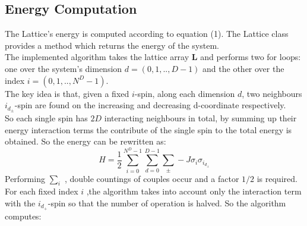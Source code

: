 \documentclass[11pt,a4paper]{article}
\begin{document}
\newpage
\subsection{Energy Computation}

The Lattice's energy is computed according to equation (1).
The Lattice class provides a method which returns the energy of the system. \\
The implemented algorithm takes the lattice array $\mathbf{L}$ and performs two for loops:\\ 
one over the system's dimension $d = (0,1,..,D-1)$ and the other over the index $i = (0,1,..,N^D-1)$. \\
The key idea is that, given a fixed $i$-spin, along each dimension $d$, two neighbours $i_{d_\pm}$-spin are found on the increasing and decreasing d-coordinate respectively.
\\So each single spin has $2D$ interacting neighbours in total, by summing up their energy interaction terms the contribute of the single spin to the total energy is obtained. So the energy can be rewritten as:
\begin{equation}
H = \frac{1}{2}\sum_{i=0}^{N^D-1}\sum_{d=0}^{D-1}\sum_{\pm}^{} -J\sigma_i\sigma_{i_{d_\pm}}
\end{equation}
Performing $\sum_{i}^{}$ , double countings of couples occur and a factor $1/2$ is required. \\
For each fixed index $i$ ,the algorithm takes into account only the interaction term with the
$i_{d_+}$-spin so that the number of operation is halved. So the algorithm computes:
\end{document}
